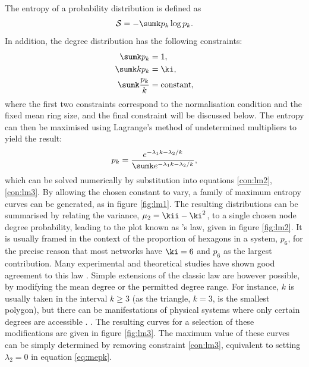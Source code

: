 The entropy of a probability distribution is defined as 
\begin{equation}
	\mathcal{S}=-\sumk p_k\log p_k. 
\end{equation}
In addition, the degree distribution has the following constraints:
\begin{align}
		\sumk p_k &=1, \\
		\sumk kp_k&=\ki,  \label{con:lm2}\\
		\sumk \frac{p_k}{k}&=\text{constant} \label{con:lm3},
\end{align}
where the first two constraints correspond to the normalisation condition and the fixed mean ring size, and the final constraint will be discussed below.
The entropy can then be maximised using Lagrange's method of undetermined multipliers to yield the result:
\begin{equation}
	\label{eq:mepk}
	p_k = \frac{e^{-\lambda_1 k - \lambda_2 / k}}{\sumk e^{-\lambda_1 k - \lambda_2 / k}},
\end{equation}
which can be solved numerically by substitution into equations \eqref{con:lm2},\eqref{con:lm3}. 
By allowing the chosen constant to vary, a family of maximum entropy curves can be generated, as in figure \ref{fig:lm1}.
The resulting distributions can be summarised by relating the variance, $\mu_2=\kii-\ki^2$, to a single chosen node degree probability, leading to the plot known as \lm's law, given in figure \ref{fig:lm2}.
It is usually framed in the context of the proportion of hexagons in a system, $p_6$, for the precise reason that most networks have $\ki=6$ and $p_6$ as the largest contribution.
Many experimental and theoretical studies have shown good agreement to this law \cite{Caer1993,Cerisier1996,Miklius2012}.
Simple extensions of the classic law are however possible, by modifying the mean degree or the permitted degree range.
For instance, $k$ is usually taken in the interval $k\geq3$ (as the triangle, $k=3$, is the smallest polygon), but there can be manifestations of physical systems where only certain degrees are accessible \cite{Rivier1988}. .
The resulting \lm{} curves for a selection of these modifications are given in figure \ref{fig:lm3}. 
The maximum value of these curves can be simply determined by removing constraint \eqref{con:lm3}, equivalent to setting $\lambda_2=0$ in equation \eqref{eq:mepk}.


